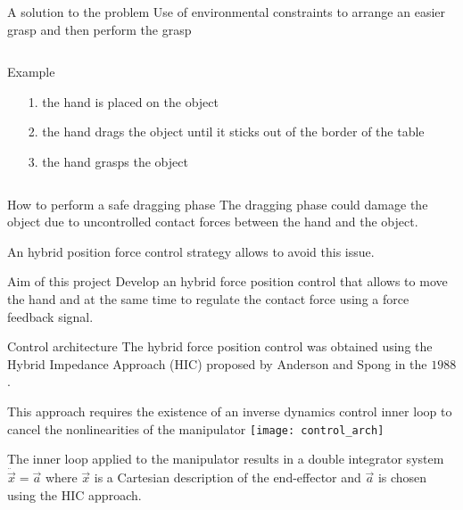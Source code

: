 \begin{frame}{A solution to the problem}
  Use of environmental constraints to arrange an easier grasp and
  then perform the grasp
  \begin{columns}
    \begin{column}{0.5\textwidth}
      \begin{exampleblock}{Example}
        \begin{itemize}
        \item[1.] the hand is placed on the object
        \item[2.] the hand drags the object until it \alert{sticks out 
          of the border} of the table 
        \item[3.] the hand grasps the object
        \end{itemize}
      \end{exampleblock}
    \end{column}
  \end{columns}
\end{frame}

\begin{frame}{How to perform a safe dragging phase}
  The dragging phase could \alert{damage} the object due to uncontrolled contact forces between the 
  hand and the object.
  \par
  An hybrid position force control strategy allows to avoid this issue.
  \vskip0.5in
  \begin{exampleblock}{Aim of this project}
    Develop an hybrid force position control that allows to move the hand and 
    at the same time to regulate the contact force using a force feedback signal.
  \end{exampleblock}
\end{frame}

\begin{frame}{Control architecture}
  The hybrid force position control was obtained using the \alert{Hybrid Impedance Approach (HIC)}
  proposed by Anderson and Spong in the $1988$.
  \par 
  This approach requires the existence of an \alert{inverse dynamics} control \alert{inner} loop
  to cancel the nonlinearities of the manipulator 
  \texttt{[image: control\_arch]}
  \par
  The inner loop applied to the manipulator results in a double integrator system
  $\ddot{\vec{x}} = \vec{a}$ where $\vec{x}$ is a Cartesian description of the end-effector
  and $\vec{a}$ is chosen using the HIC approach.
\end{frame}

